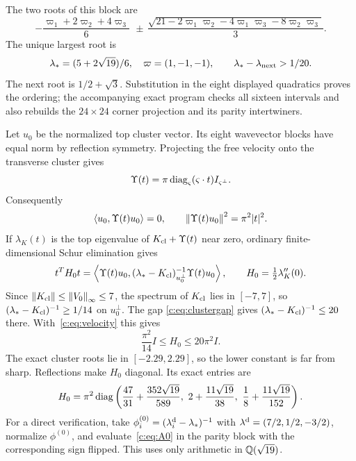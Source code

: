 The two roots of this block are
\begin{equation}
 -\frac{\varpi_1+2\varpi_2+4\varpi_3}{6}
 \ \,\pm\,\frac{\sqrt{21-2\varpi_1\varpi_2-4\varpi_1\varpi_3-8\varpi_2\varpi_3}}3.
                                                               \label{c:eq:clusterroots}
\end{equation}
The unique largest root is
\begin{equation}
 \lambda_*=(5+2\sqrt{19})/6,
 \quad \varpi=(1,-1,-1),\qquad
 \lambda_*-\lambda_{\rm next}>1/20.                  \label{c:eq:clustergap}
\end{equation}
The next root is $1/2+\sqrt3$. Substitution in the eight displayed
quadratics proves the ordering; the accompanying exact program checks
all sixteen intervals and also rebuilds the $24\times24$ corner
projection and its parity intertwiners.

Let $u_0$ be the normalized top cluster vector. Its eight wavevector
blocks have equal norm by reflection symmetry. Projecting the free
velocity onto the transverse cluster gives
\[
 \Upsilon(t)=\pi\operatorname{diag}_{\varsigma}(\varsigma\cdot t)I_{\varsigma^\perp}.
\]
Consequently
\begin{equation}
 \left\langle u_0,\Upsilon(t)u_0\right\rangle=0,\qquad
 \left\lVert \Upsilon(t)u_0\right\rVert^2=\pi^2|t|^2.                    \label{c:eq:velocity}
\end{equation}
If $\lambda_K(t)$ is the top eigenvalue of $K_{\rm cl}+\Upsilon(t)$ near zero, ordinary
finite-dimensional Schur elimination gives
\begin{equation}
 t^TH_0t=\left\langle \Upsilon(t)u_0,(\lambda_*-K_{\rm cl})^{-1}_{u_0^\perp}\Upsilon(t)u_0\right\rangle,
 \qquad H_0=\tfrac12\lambda_K''(0).
                                                               \label{c:eq:A0}
\end{equation}
Since $\left\lVert K_{\rm cl}\right\rVert\le\left\lVert V_0\right\rVert_\infty\le7$, the spectrum of $K_{\rm cl}$ lies in
$[-7,7]$, so $(\lambda_*-K_{\rm cl})^{-1}\ge1/14$ on $u_0^\perp$. The gap
\eqref{c:eq:clustergap} gives $(\lambda_*-K_{\rm cl})^{-1}\le20$ there.
With~\eqref{c:eq:velocity} this gives
\begin{equation}
 \frac{\pi^2}{14}I\le H_0\le20\pi^2I.           \label{c:eq:A0bounds}
\end{equation}
The exact cluster roots lie in $[-2.29,2.29]$, so the lower constant is
far from sharp. Reflections make $H_0$
diagonal. Its exact entries are
\begin{equation}
 H_0=\pi^2\diag
 \left(\frac{47}{31}+\frac{352\sqrt{19}}{589},\ 
 2+\frac{11\sqrt{19}}{38},\ 
 \frac18+\frac{11\sqrt{19}}{152}\right).              \label{c:eq:explicitA0}
\end{equation}
For a direct verification, take
$\phi^{(0)}_i=(\lambda^{\rm d}_i-\lambda_*)^{-1}$ with $\lambda^{\rm d}=(7/2,1/2,-3/2)$, normalize $\phi^{(0)}$,
and evaluate~\eqref{c:eq:A0} in the parity block with the corresponding
sign flipped. This uses only arithmetic in $\mathbb Q(\sqrt{19})$.

